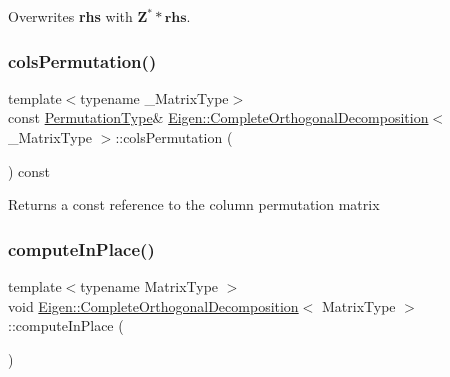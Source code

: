 Overwrites {\bfseries{rhs}} with $ \mathbf{Z}^* * \mathbf{rhs} $. \mbox{\label{class_eigen_1_1_complete_orthogonal_decomposition_a601c67a4a0bbe9c7b25b885279db9ff2}} 
\subsubsection{\texorpdfstring{colsPermutation()}{colsPermutation()}}
{\footnotesize\ttfamily template$<$typename \+\_\+\+Matrix\+Type$>$ \\
const \mbox{\hyperlink{class_eigen_1_1_permutation_matrix}{Permutation\+Type}}\& \mbox{\hyperlink{class_eigen_1_1_complete_orthogonal_decomposition}{Eigen\+::\+Complete\+Orthogonal\+Decomposition}}$<$ \+\_\+\+Matrix\+Type $>$\+::cols\+Permutation (\begin{DoxyParamCaption}{ }\end{DoxyParamCaption}) const\hspace{0.3cm}{\ttfamily [inline]}}

\begin{DoxyReturn}{Returns}
a const reference to the column permutation matrix 
\end{DoxyReturn}
\mbox{\label{class_eigen_1_1_complete_orthogonal_decomposition_adb0b963d7d8f96492904e8eda03efbf5}} 
\subsubsection{\texorpdfstring{computeInPlace()}{computeInPlace()}}
{\footnotesize\ttfamily template$<$typename Matrix\+Type $>$ \\
void \mbox{\hyperlink{class_eigen_1_1_complete_orthogonal_decomposition}{Eigen\+::\+Complete\+Orthogonal\+Decomposition}}$<$ Matrix\+Type $>$\+::compute\+In\+Place (\begin{DoxyParamCaption}{ }\end{DoxyParamCaption})\hspace{0.3cm}{\ttfamily [protected]}}

